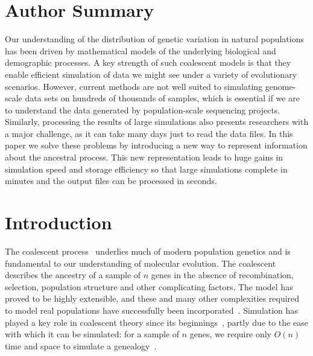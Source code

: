 \documentclass[10pt,letterpaper]{article}
\begin{document}
\section*{Author Summary}

Our understanding of the distribution of genetic variation in natural
populations has been driven by mathematical models of the underlying biological
and demographic processes. A key strength of such coalescent models is that
they enable efficient simulation of data we might see under a variety of
evolutionary scenarios. However, current methods are not well suited to
simulating genome-scale data sets on hundreds of thousands of samples, which is
essential if we are to understand the data generated by population-scale
sequencing projects.  Similarly, processing the results of large simulations
also presents researchers with a major challenge, as it can take many days just
to read the data files. In this paper we solve these problems by introducing a
new way to represent information about the ancestral process. This new
representation leads to huge gains in simulation speed and storage efficiency
so that large simulations complete in minutes and the output files can be
processed in seconds.


\linenumbers

\section*{Introduction}
\label{sec-introduction}

The coalescent process~\citep{k82,h83a} underlies much of modern population
genetics and is fundamental to our understanding of molecular evolution. The
coalescent describes the ancestry of a sample of $n$ genes in the absence of
recombination, selection, population structure and other complicating factors.
The model has proved to be highly extensible, and these and many other
complexities required to model real populations have successfully been
incorporated~\citep{w08}. Simulation has played a key role in coalescent theory
since its beginnings~\citep{h83a}, partly due to the ease with which it can be
simulated: for a sample of $n$ genes, we require only $O(n)$ time and space to
simulate a genealogy~\citep{h90}.
\end{document}
